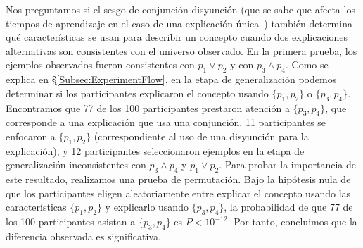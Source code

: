 Nos preguntamos si el sesgo de conjunción-disyunción (que se sabe que afecta los tiempos de aprendizaje en el caso de una explicación única~\cite{bourne1970knowing}) también determina qué características se usan para describir un concepto cuando dos explicaciones alternativas son consistentes con el universo observado. En la primera prueba, los ejemplos observados fueron consistentes con $ p_1 \vee p_2 $ y con $ p_3 \wedge p_4 $. Como se explica en \S\ref{Subsec:ExperimentFlow}, en la etapa de generalización podemos determinar si los participantes explicaron el concepto usando $ \{p_1, p_2 \} $ o $ \{p_3, p_4 \} $. Encontramos que 77 de los 100 participantes prestaron atención a $ \{p_3, p_4 \} $, que corresponde a una explicación que usa una conjunción. 11 participantes se enfocaron a $ \{p_1, p_2 \} $ (correspondiente al uso de una disyunción para la explicación), y 12 participantes seleccionaron ejemplos en la etapa de generalización inconsistentes con $ p_3 \wedge p_4 $ y $ p_1 \vee p_2$. Para probar la importancia de este resultado, realizamos una prueba de permutación. Bajo la hipótesis nula de que los participantes eligen aleatoriamente entre explicar el concepto usando las características $ \{p_1, p_2 \} $ y explicarlo usando $ \{p_3, p_4 \} $, la probabilidad de que 77 de los 100 participantes asistan a $ \{ p_3, p_4 \} $ es $ P <10^{-12} $. Por tanto, concluimos que la diferencia observada es significativa.

